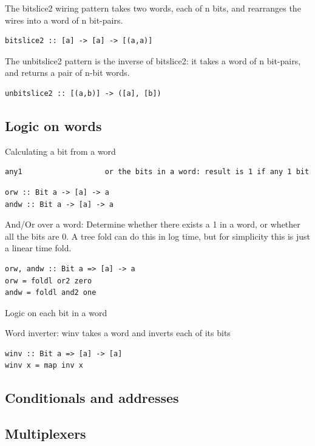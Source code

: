 \documentclass[]{svmono}
\begin{document}
The bitslice2 wiring pattern takes two words, each of n bits, and
rearranges the wires into a word of n bit-pairs.

\begin{verbatim}
bitslice2 :: [a] -> [a] -> [(a,a)]
\end{verbatim}

The unbitslice2 pattern is the inverse of bitslice2: it takes a word
of n bit-pairs, and returns a pair of n-bit words.

\begin{verbatim}
unbitslice2 :: [(a,b)] -> ([a], [b])
\end{verbatim}
\subsection*{Logic on words}
\label{sec:org59197a6}


Calculating a bit from a word


\begin{verbatim}
any1                   or the bits in a word: result is 1 if any 1 bit
\end{verbatim}


\begin{verbatim}
orw :: Bit a -> [a] -> a
andw :: Bit a -> [a] -> a
\end{verbatim}


And/Or over a word: Determine whether there exists a 1 in a word,
or whether all the bits are 0.  A tree fold can do this in log
time, but for simplicity this is just a linear time fold.


\begin{verbatim}
orw, andw :: Bit a => [a] -> a
orw = foldl or2 zero
andw = foldl and2 one
\end{verbatim}


Logic on each bit in a word

Word inverter: winv takes a word and inverts each of its bits


\begin{verbatim}
winv :: Bit a => [a] -> [a]
winv x = map inv x
\end{verbatim}
\subsection*{Conditionals and addresses}
\label{sec:orgd4df35c}

\subsection*{Multiplexers}
\label{sec:org1ebac63}
\end{document}
